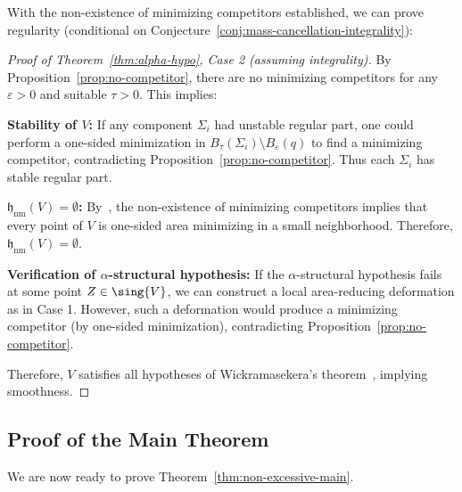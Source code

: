 With the non-existence of minimizing competitors established, we can prove regularity (conditional on Conjecture~\ref{conj:mass-cancellation-integrality}):

\begin{proof}[Proof of Theorem~\ref{thm:alpha-hypo}, Case 2 (assuming integrality)]
By Proposition~\ref{prop:no-competitor}, there are no minimizing competitors for any $\varepsilon > 0$ and
suitable $\tau > 0$. This implies:

\textbf{Stability of $V$:} If any component $\Sigma_i$ had unstable regular part, one could perform a one-sided
minimization in $B_\tau(\Sigma_i) \setminus B_\varepsilon(q)$ to find a minimizing competitor,
contradicting Proposition~\ref{prop:no-competitor}. Thus each $\Sigma_i$ has stable regular part.

\textbf{$\mathfrak{h}_{\mathrm{nm}}(V) = \emptyset$:} By~\cite[Proposition~3.7]{CLS22}, the non-existence
of minimizing competitors implies that every point of $V$ is one-sided area minimizing in a small
neighborhood. Therefore, $\mathfrak{h}_{\mathrm{nm}}(V) = \emptyset$.

\textbf{Verification of $\alpha$-structural hypothesis:} If the $\alpha$-structural hypothesis fails at
some point $Z \in \sing{V}$, we can construct a local area-reducing deformation as in Case 1. However,
such a deformation would produce a minimizing competitor (by one-sided minimization), contradicting
Proposition~\ref{prop:no-competitor}.

Therefore, $V$ satisfies all hypotheses of Wickramasekera's theorem~\cite{Wic14}, implying smoothness.
\end{proof}

\subsection{Proof of the Main Theorem}

We are now ready to prove Theorem~\ref{thm:non-excessive-main}.

